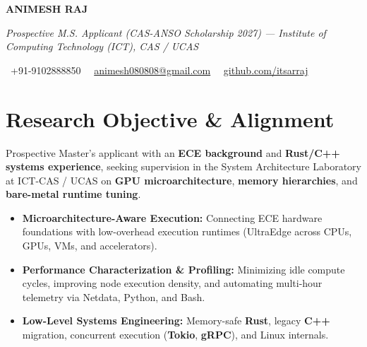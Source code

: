 \documentclass[a4paper,11pt]{article}
\newcommand{\socialicon}[1]{\raisebox{-0.05em}{\resizebox{!}{1em}{#1}}}
\newcommand{\headerfontiii}{\fontfamily{ppl}\selectfont} %
\begin{document}
\headerfontiii

\begin{center}
    {\Huge\textbf{ANIMESH RAJ}}
\end{center}
\vspace{-6mm}

\begin{center}
    {\small\textit{Prospective M.S. Applicant (CAS-ANSO Scholarship 2027) --- Institute of Computing Technology (ICT), CAS / UCAS}}
\end{center}
\vspace{-6mm}

\begin{center}
    {\small
    \socialicon{\faPhone}\ +91-9102888850 \textbar\ 
    \socialicon{\faEnvelope}\ \href{mailto:animesh080808@gmail.com}{animesh080808@gmail.com} \textbar\ 
    \socialicon{\faGithub}\ \href{https://github.com/itsarraj}{github.com/itsarraj}
    }
\end{center}
\vspace{-4mm}

\section{\textbf{Research Objective \& Alignment}}
\vspace{1mm}
{\small
Prospective Master's applicant with an \textbf{ECE background} and \textbf{Rust/C++ systems experience}, seeking supervision in the System Architecture Laboratory at ICT-CAS / UCAS on \textbf{GPU microarchitecture}, \textbf{memory hierarchies}, and \textbf{bare-metal runtime tuning}.
\begin{itemize}[leftmargin=3ex, itemsep=0.4mm, topsep=1mm]
    \item \textbf{Microarchitecture-Aware Execution:} Connecting ECE hardware foundations with low-overhead execution runtimes (UltraEdge across CPUs, GPUs, VMs, and accelerators).
    \item \textbf{Performance Characterization \& Profiling:} Minimizing idle compute cycles, improving node execution density, and automating multi-hour telemetry via Netdata, Python, and Bash.
    \item \textbf{Low-Level Systems Engineering:} Memory-safe \textbf{Rust}, legacy \textbf{C++} migration, concurrent execution (\textbf{Tokio}, \textbf{gRPC}), and Linux internals.
\end{itemize}
}
\vspace{-3mm}
\end{document}

